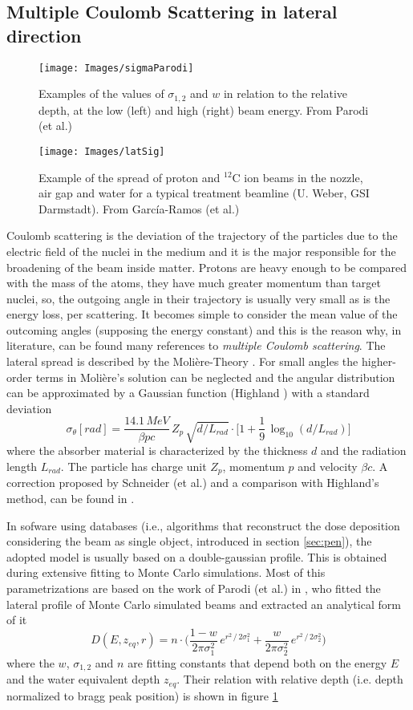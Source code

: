 \documentclass[12pt, a4paper, twoside]{book}
\begin{document}
\subsection{Multiple Coulomb Scattering in lateral direction}
\label{sec:mcs}
\begin{figure}[!t]
\centering
\texttt{[image: Images/sigmaParodi]}
\caption{Examples of the values of $\sigma_{1,2}$ and $w$ in relation to the relative depth, at the low (left) and high (right) beam energy. From Parodi (et al.) \cite{par:latspr}}
\label{fig:sigPar}
\end{figure}
\begin{figure}[!t]
\texttt{[image: Images/latSig]}
\caption{Example of the spread of proton and $^{12}$C ion beams in the nozzle, air gap and water for a typical treatment beamline (U. Weber, GSI Darmstadt). From García-Ramos (et al.) \cite{garc:nucu}}
\label{fig:latSig1}
\end{figure}
Coulomb scattering is the deviation of the trajectory of the particles due to the electric field of the nuclei in the medium and it is the major responsible for the broadening of the beam inside matter. Protons are heavy enough to be compared with the mass of the atoms, they have much greater momentum than target nuclei, so, the outgoing angle in their trajectory is usually very small as is the energy loss, per scattering. It becomes simple to consider the mean value of the outcoming angles (supposing the energy constant) and this is the reason why, in literature, can be found many references to \emph{multiple Coulomb scattering}.
The lateral spread is described by the Molière-Theory \cite{mol:mcs}. For small angles the higher-order terms in Molière's solution can be neglected and the angular distribution can be approximated by a Gaussian function (Highland \cite{high:mcs}) with a standard deviation 
\[
\sigma_\theta [rad]= \frac{14.1\,MeV}{\beta pc}\, Z_p\, \sqrt{d/L_{rad}} \cdot \bigg[ 1 + \frac{1}{9}\,\log_{10} (d/L_{rad} )\bigg]
\]
where the absorber material is characterized by the thickness $d$ and the radiation length $L_{rad}$. The particle has charge unit $Z_p$, momentum $p$ and velocity $\beta c$.
A correction proposed by Schneider (et al.) and a comparison with Highland's method, can be found in \cite{schn:mcs}. 

In sofware using databases (i.e., algorithms that reconstruct the dose deposition considering the beam as single object, introduced in section \ref{sec:pen}), the adopted model is usually based on a double-gaussian profile. This is obtained during extensive fitting to Monte Carlo simulations. Most of this parametrizations are based on the work of Parodi (et al.) in \cite{par:latspr}, who fitted the lateral profile of Monte Carlo simulated beams and extracted an analytical form of it
\[
D(E,z_{eq},r) = n\cdot \bigg(  \frac{1-w}{2\pi\sigma_1^2}\,e^{r^2\,/\,2\sigma_1^2} + \frac{w}{2\pi\sigma_2^2}\,e^{r^2\,/\,2\sigma_2^2} \bigg)
\]
where the $w$, $\sigma_{1,2}$ and $n$ are fitting constants that depend both on the energy $E$ and the water equivalent depth $z_{eq}$. Their relation with relative depth (i.e. depth normalized to bragg peak position) is shown in figure \ref{fig:sigPar}
\end{document}
